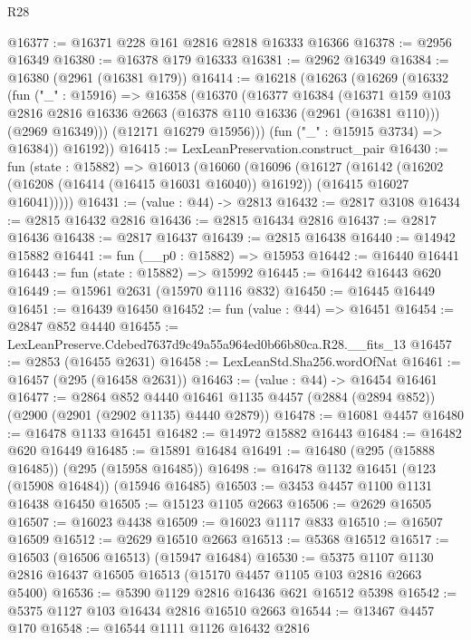 \begin{lexlean}{R28}
\begin{coremodule}
@16377 := @16371 @228 @161 @2816 @2818 @16333 @16366
@16378 := @2956 @16349
@16380 := @16378 @179 @16333
@16381 := @2962 @16349
@16384 := @16380 (@2961 (@16381 @179))
@16414 := @16218
    (@16263
      (@16269
        (@16332
          (fun ("_" : @15916) =>
          @16358
            (@16370
              (@16377
                @16384
                (@16371
                  @159
                  @103
                  @2816
                  @2816
                  @16336
                  @2663
                  (@16378 @110 @16336 (@2961 (@16381 @110)))
                  (@2969 @16349)))
              (@12171 @16279 @15956)))
          (fun ("_" : @15915 @3734) => @16384))
        @16192))
@16415 := LexLeanPreservation.construct_pair
@16430 := fun (state : @15882) =>
  @16013
    (@16060
      (@16096
        (@16127
          (@16142
            (@16202 (@16208 (@16414 (@16415 @16031 @16040)) @16192))
            (@16415 @16027 @16041)))))
@16431 := (value : @44) -> @2813
@16432 := @2817 @3108
@16434 := @2815 @16432 @2816
@16436 := @2815 @16434 @2816
@16437 := @2817 @16436
@16438 := @2817 @16437
@16439 := @2815 @16438
@16440 := @14942 @15882
@16441 := fun (__p0 : @15882) => @15953
@16442 := @16440 @16441
@16443 := fun (state : @15882) => @15992
@16445 := @16442 @16443 @620
@16449 := @15961 @2631 (@15970 @1116 @832)
@16450 := @16445 @16449
@16451 := @16439 @16450
@16452 := fun (value : @44) => @16451
@16454 := @2847 @852 @4440
@16455 := LexLeanPreserve.Cdebed7637d9c49a55a964ed0b66b80ca.R28.__fits_13
@16457 := @2853 (@16455 @2631)
@16458 := LexLeanStd.Sha256.wordOfNat
@16461 := @16457 (@295 (@16458 @2631))
@16463 := (value : @44) -> @16454 @16461
@16477 := @2864
    @852
    @4440
    @16461
    @1135
    @4457
    (@2884 (@2894 @852))
    (@2900 (@2901 (@2902 @1135) @4440 @2879))
@16478 := @16081 @4457
@16480 := @16478 @1133 @16451
@16482 := @14972 @15882 @16443
@16484 := @16482 @620 @16449
@16485 := @15891 @16484
@16491 := @16480 (@295 (@15888 @16485)) (@295 (@15958 @16485))
@16498 := @16478 @1132 @16451 (@123 (@15908 @16484)) (@15946 @16485)
@16503 := @3453 @4457 @1100 @1131 @16438 @16450
@16505 := @15123 @1105 @2663
@16506 := @2629 @16505
@16507 := @16023 @4438
@16509 := @16023 @1117 @833
@16510 := @16507 @16509
@16512 := @2629 @16510 @2663
@16513 := @5368 @16512
@16517 := @16503 (@16506 @16513) (@15947 @16484)
@16530 := @5375 @1107 @1130 @2816 @16437 @16505 @16513 (@15170 @4457 @1105 @103 @2816 @2663 @5400)
@16536 := @5390 @1129 @2816 @16436 @621 @16512 @5398
@16542 := @5375 @1127 @103 @16434 @2816 @16510 @2663
@16544 := @13467 @4457 @170
@16548 := @16544 @1111 @1126 @16432 @2816

\end{coremodule}
\end{lexlean}
